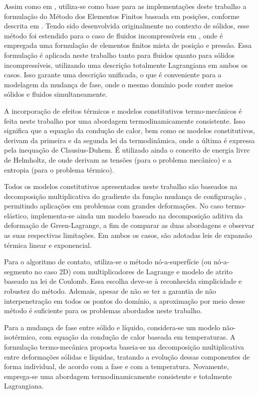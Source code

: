 \documentclass[Tese.tex]{subfiles}
\begin{document}
Assim como em , utiliza-se como base para as implementações deste trabalho a formulação do Método dos Elementos Finitos baseada em posições, conforme descrita em . Tendo sido desenvolvida originalmente no contexto de sólidos, esse método foi estendido para o caso de fluidos incompressíveis em , onde é empregada uma formulação de elementos finitos mista de posição e pressão. Essa formulação é aplicada neste trabalho tanto para fluidos quanto para sólidos incompressíveis, utilizando uma descrição totalmente Lagrangiana em ambos os casos. Isso garante uma descrição unificada, o que é conveniente para a modelagem da mudança de fase, onde o mesmo domínio pode conter meios sólidos e fluidos simultaneamente. 
 
A incorporação de efeitos térmicos e modelos constitutivos termo-mecânicos é feita neste trabalho por uma abordagem termodinamicamente consistente. Isso significa que a equação da condução de calor, bem como os modelos constitutivos, derivam da primeira e da segunda lei da termodinâmica, onde a última é expressa pela inequação de Clausius-Duhem. É utilizado ainda o conceito de energia livre de Helmholtz, de onde derivam as tensões (para o problema mecânico) e a entropia (para o problema térmico).

Todos os modelos constitutivos apresentados neste trabalho são baseados na decomposição multiplicativa do gradiente da função mudança de configuração \cite{Kroner1960273,LEE1969}, permitindo aplicações em problemas com grandes deformações. No caso termo-elástico, implementa-se ainda um modelo baseado na decomposição aditiva da deformação de Green-Lagrange, a fim de comparar as duas abordagens e observar as suas respectivas limitações. Em ambos os casos, são adotadas leis de expansão térmica linear e exponencial.

Para o algoritmo de contato, utiliza-se o método nó-a-superfície (ou nó-a-segmento no caso 2D) com multiplicadores de Lagrange e modelo de atrito baseado na lei de Coulomb. Essa escolha deve-se à reconhecida simplicidade e robustez do método. Ademais, apesar de não se ter a garantia de não interpenetração em todos os pontos do domínio, a aproximação por meio desse método é suficiente para os problemas abordados neste trabalho.

Para a mudança de fase entre sólido e líquido, considera-se um modelo não-isotérmico, com equação da condução de calor baseada em temperaturas. A formulação termo-mecânica proposta baseia-se na decomposição multiplicativa entre deformações sólidas e líquidas, tratando a evolução dessas componentes de forma individual, de acordo com a fase e com a temperatura. Novamente, emprega-se uma abordagem termodinamicamente consistente e totalmente Lagrangiana.
\end{document}
